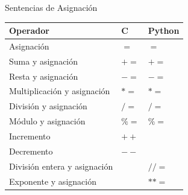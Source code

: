 \documentclass{beamer}
\begin{document}
\begin{frame}[fragile]{Sentencias de Asignación}
\small
\begin{tabular}{|l|l|l|}\hline \hline
	\textbf{Operador} &\textbf{C} & \textbf{Python}   \\ \hline 
	Asignación         & $=$  & $=$  \\  \hline
	Suma y asignación       & $+=$ & $+=$ \\  \hline
	Resta y asignación          & $-=$ & $-=$  \\  \hline
	Multiplicación y asignación       & $*=$ & $*=$ \\  \hline
	División y asignación   & $/=$ & $/=$  \\  \hline
	Módulo y asignación   & $\%=$ & $\%=$  \\  \hline
	Incremento    & $++$ &  \\  \hline
	Decremento   & $--$ &   \\  \hline
	División entera y asignación   &  & $//=$  \\  \hline
	Exponente y asignación   & & $**=$  \\  \hline
\end{tabular}
\end{frame}
\end{document}
